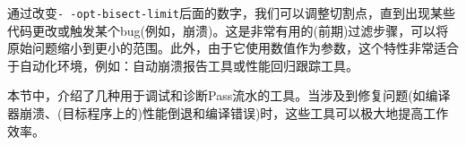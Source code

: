 通过改变\texttt{-\,-opt-bisect-limit}后面的数字，我们可以调整切割点，直到出现某些代码更改或触发某个bug(例如，崩溃)。这是非常有用的(前期)过滤步骤，可以将原始问题缩小到更小的范围。此外，由于它使用数值作为参数，这个特性非常适合于自动化环境，例如：自动崩溃报告工具或性能回归跟踪工具。

本节中，介绍了几种用于调试和诊断Pass流水的工具。当涉及到修复问题(如编译器崩溃、(目标程序上的)性能倒退和编译错误)时，这些工具可以极大地提高工作效率。
































